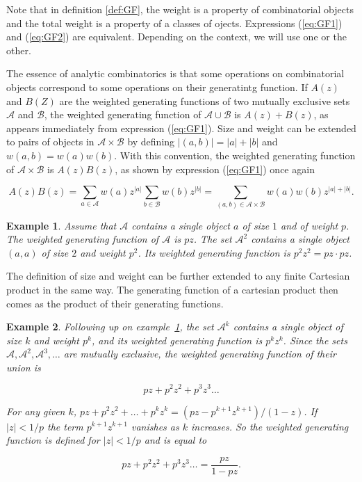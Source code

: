 \documentclass{article}
\newtheorem{example}{Example}
\begin{document}
Note that in definition \ref{def:GF}, the weight is a property of
combinatorial objects and the total weight is a property of a classes of
ojects. Expressions (\ref{eq:GF1}) and (\ref{eq:GF2}) are equivalent.
Depending on the context, we will use one or the other.

The essence of analytic combinatorics is that some operations on
combinatorial objects correspond to some operations on their generatintg
function. If $A(z)$ and $B(Z)$ are the weighted generating functions of
two mutually exclusive sets $\mathcal{A}$ and $\mathcal{B}$, the weighted
generating function of $\mathcal{A} \cup \mathcal{B}$ is $A(z) + B(z)$, as
appears immediately from expression (\ref{eq:GF1}). Size and weight can be
extended to pairs of objects in $\mathcal{A} \times \mathcal{B}$ by
defining $|(a,b)| = |a| + |b|$ and $w(a,b) = w(a)w(b)$. With this
convention, the weighted generating function of $\mathcal{A} \times
\mathcal{B}$ is $A(z)B(z)$, as shown by expression (\ref{eq:GF1})
once again

\begin{equation*}
A(z)B(z) =
\sum_{a\in \mathcal{A}}w(a)z^{|a|} \sum_{b\in \mathcal{B}}w(b)z^{|b|}
= \sum_{(a,b) \in \mathcal{A} \times \mathcal{B}} w(a)w(b)z^{|a|+|b|}.
\end{equation*}

\begin{example}
\label{ex:simple}
Assume that $\mathcal{A}$ contains a single object $a$ of size $1$ and of
weight $p$. The weighted generating function of $\mathcal{A}$ is $pz$.
The set $\mathcal{A}^2$ contains a single object $(a,a)$ of size $2$ and
weight $p^2$. Its weighted generating function is $p^2z^2 = pz \cdot pz$.
\end{example}

The definition of size and weight can be further extended to any finite
Cartesian product in the same way. The generating function of a cartesian
product then comes as the product of their generating functions.

\begin{example}
\label{ex:sequences}
Following up on example~\ref{ex:simple}, the set $\mathcal{A}^k$ contains
a single object of size $k$ and weight $p^k$, and its weighted generating
function is $p^kz^k$. Since the sets $\mathcal{A}, \mathcal{A}^2,
\mathcal{A}^3,\ldots$ are mutually exclusive, the weighted generating
function of their union is

\begin{equation*}
pz + p^2z^2 + p^3z^3 \ldots
\end{equation*}

For any given $k$, $pz + p^2z^2 + \ldots + p^kz^k = (pz-p^{k+1}z^{k+1}) /
(1-z)$. If $|z| < 1/p$ the term $p^{k+1}z^{k+1}$ vanishes as $k$
increases. So the weighted generating function is defined for $|z| < 1/p$
and is equal to

\begin{equation*}
pz + p^2z^2 + p^3z^3 \ldots = \frac{pz}{1-pz}.
\end{equation*}
\end{example}
\end{document}
